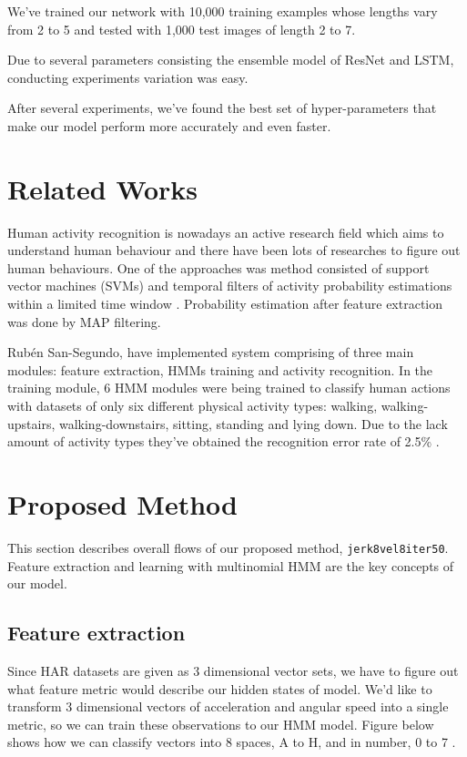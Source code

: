 \documentclass[10pt,twocolumn,letterpaper]{article}
\begin{document}
We've trained our network with 10,000 training examples whose lengths vary from 2 to 5 and tested with 1,000 test images of length 2 to 7.

Due to several parameters consisting the ensemble model of ResNet and LSTM, conducting experiments variation was easy.

After several experiments, we've found the best set of hyper-parameters that make our model perform more accurately and even faster.


\section{Related Works}
Human activity recognition is nowadays an active research field which aims to understand human behaviour and there have been lots of researches to figure out human behaviours. One of the approaches was method consisted of support vector machines (SVMs) and temporal filters of activity probability estimations within a limited time window \cite{haptpaper}. Probability estimation after feature extraction was done by MAP filtering.

Rubén San-Segundo, \etal have implemented system comprising of three main modules: feature extraction, HMMs training and activity recognition. In the training module, 6 HMM modules were being trained to classify human actions with datasets of only six different physical activity types: walking, walking-upstairs, walking-downstairs, sitting, standing and lying down. Due to the lack amount of activity types they've obtained the recognition error rate of 2.5\% \cite{monitoring}.

\section{Proposed Method}
This section describes overall flows of our proposed method, \texttt{jerk8vel8iter50}. Feature extraction and learning with multinomial HMM are the key concepts of our model.

\subsection{Feature extraction}
Since HAR datasets are given as 3 dimensional vector sets, we have to figure out what feature metric would describe our hidden states of model. We'd like to transform 3 dimensional vectors of acceleration and angular speed into a single metric, so we can train these observations to our HMM model. Figure below shows how we can classify vectors into 8 spaces, A to H, and in number, 0 to 7 \wrt.
\end{document}
